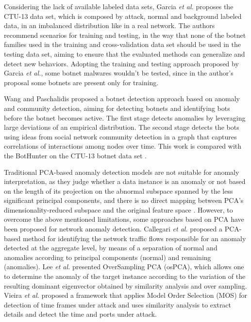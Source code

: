 Considering the lack of available labeled data sets, Garcia \emph{et al.} \cite{garcia2014empirical} proposes the CTU-13 data set, which is composed by attack, normal and background labeled data, in an imbalanced distribution like in a real network. The authors recommend scenarios for training and testing, in the way that none of the botnet families used in the training and cross-validation data set should be used in the testing data set, aiming to ensure that the evaluated methods can generalize and detect new behaviors. Adopting the training and testing approach proposed by Garcia \emph{et al.}, some botnet malwares wouldn't be tested, since in the author's proposal some botnets are present only for training. 

Wang and Paschalidis \cite{wang2017botnet} proposed a botnet detection approach based on anomaly and community detection, aiming for detecting botnets and identifying bots before the botnet becomes active. The first stage detects anomalies by leveraging large deviations of an empirical distribution. The second stage detects the bots using ideas from social network community detection in a graph that captures correlations of interactions among nodes over time. This work is compared with the BotHunter \cite{gu2007bothunter} on the CTU-13 botnet data set \cite{garcia2014empirical}.


Traditional PCA-based anomaly detection models are not suitable for anomaly interpretation, as they judge whether a data instance is an anomaly or not based on the length of its projection on the abnormal subspace spanned by the less significant principal components, and there is no direct mapping between PCA’s dimensionality-reduced subspace and the original feature space \cite{ringberg2007sensitivity}. However, to overcome the above mentioned limitations, some approaches based on PCA have been proposed for network anomaly detection. Callegari \emph{et al.} \cite{callegari2011novel} proposed a PCA-based method for identifying the network traffic flows responsible for an anomaly detected at the aggregate level, by means of a separation of normal and anomalies according to principal components (normal) and remaining (anomalies). Lee \emph{et al.} \cite{Lee2013} presented OverSampling PCA (osPCA), which allows one to determine the anomaly of the target instance according to the variation of the resulting dominant eigenvector obtained by similarity analysis and over sampling. Vieira \emph{et al.} \cite{vieira2017model} proposed a framework that applies Model Order Selection (MOS) for detection of time frames under attack and uses similarity analysis to extract details and detect the time and ports under attack.

